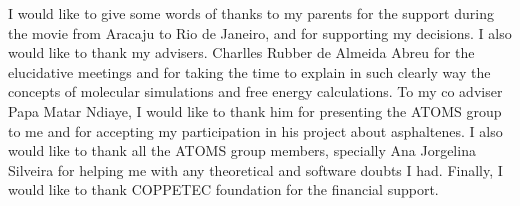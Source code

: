 \documentclass[
	12pt,				%
	openany,			%
	oneside,			%
	a4paper,			%
	english,			%
	brazil				%
	]{abntex2}
\begin{document}
\begin{agradecimentos}
I would like to give some words of thanks to my parents for the support during the movie from Aracaju to Rio de Janeiro, and for supporting my decisions. I also would like to thank my advisers. Charlles Rubber de Almeida Abreu for the elucidative meetings and for taking the time to explain in such clearly way the concepts of molecular simulations and free energy calculations. To my co adviser Papa Matar Ndiaye, I would like to thank him for presenting the ATOMS group to me and for accepting my participation in his project about asphaltenes. I also would like to thank all the ATOMS group members, specially Ana Jorgelina Silveira  for helping me with any theoretical and software doubts I had. Finally, I would like to thank COPPETEC foundation for the financial support. 
\end{agradecimentos}



\setlength{\absparsep}{18pt} %
%
\end{document}
